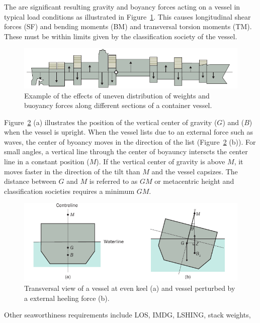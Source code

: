 \documentclass[runningheads]{llncs}
\begin{document}
The are significant resulting gravity and boyancy forces acting on a vessel in typical load conditions as illustrated in Figure~\ref{fig:split_vessel}. This causes longitudinal shear forces (SF) and bending moments (BM) and transversal torsion moments (TM). These must be within limits given by the classification society of the vessel. 
\begin{figure}[h!]
\begin{center}
  \includegraphics{figures/3_12}
\end{center}
\caption{Example of the effects of uneven distribution of weights and buoyancy forces along different sections of a container vessel.}
\label{fig:split_vessel}
\end{figure}

Figure~\ref{fig:stability} (a) illustrates the position of the vertical center of gravity ($G$) and  ($B$) when the vessel is upright. When the vessel lists due to an external force such as waves, the center of byoancy moves in the direction of the list (Figure~\ref{fig:stability} (b)). For small angles, a vertical line through the center of boyauncy interscts the center line in a constant position ($M$). If the vertical center of gravity is above $M$, it moves faster in the direction of the tilt than $M$ and the vessel capsizes. The distance between $G$ and $M$ is referred to as $\mathit{GM}$ or metacentric height and classification societies requires a minimum $\mathit{GM}$.
\begin{figure}[h!]
  \includegraphics{figures/3_11} 
\caption{ Transversal view of a vessel at even keel (a) and vessel perturbed by a external heeling force (b).}
\label{fig:stability}
\end{figure}

Other seaworthiness requirements include LOS, IMDG, LSHING, stack weights,
\end{document}
